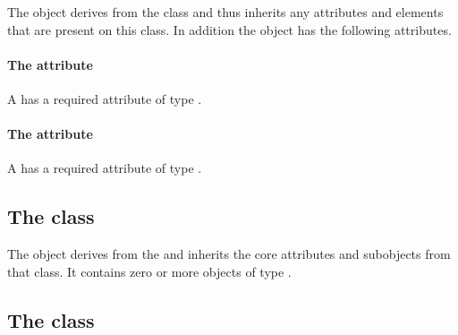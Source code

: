 


The \GeometryDefinition object derives from the \SBase class and thus
inherits any attributes and elements that are present on this class.
In addition the \GeometryDefinition object has the following attributes.

\paragraph{The \fixttspace{} attribute}

A \GeometryDefinition has a required attribute  of type
.


\paragraph{The \fixttspace{} attribute}

A \GeometryDefinition has a required attribute  of type
.


\subsection{The  class}
\label{listofcoordinatecomponents-class}


The \ListOfCoordinateComponents object derives from the 
and inherits the core attributes and subobjects from that class. It
contains zero or more objects of type \CoordinateComponent.

\subsection{The  class}
\label{coordinatecomponent-class}

